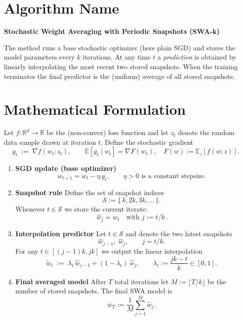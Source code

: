 \documentclass{article}
\begin{document}
\section*{Algorithm Name}
\textbf{Stochastic Weight Averaging with Periodic Snapshots (SWA‑k)}  

The method runs a base stochastic optimizer (here plain SGD) and stores the model parameters every $k$ iterations.  
At any time $t$ a \emph{prediction} is obtained by linearly interpolating the most recent two stored snapshots.  
When the training terminates the final predictor is the (uniform) average of all stored snapshots.

\section*{Mathematical Formulation}
Let $f:\mathbb{R}^d\!\to\!\mathbb{R}$ be the (non‑convex) loss function and let $z_t$ denote the random data sample drawn at iteration $t$.  
Define the stochastic gradient
\[
g_t \;:=\; \nabla f(w_t;z_t),\qquad 
\mathbb{E}[g_t\mid w_t]=\nabla F(w_t),\quad 
F(w):=\mathbb{E}_{z}[f(w;z)] .
\]

\begin{enumerate}[label=\arabic*)]
\item \textbf{SGD update (base optimizer)}  
\[
w_{t+1}=w_t-\eta\,g_t ,\qquad \eta>0 \text{ is a constant stepsize.}
\tag{1}
\]

\item \textbf{Snapshot rule}  
Define the set of snapshot indices
\[
\mathcal{S}:=\{\,k,2k,3k,\dots\,\}.
\]
Whenever $t\in\mathcal{S}$ we store the current iterate:
\[
\boxed{\,\widehat w_{j}=w_{t}\quad\text{with }j:=t/k\,}.
\tag{2}
\]

\item \textbf{Interpolation predictor}  
Let $t\in\mathcal{S}$ and denote the two latest snapshots
\[
\widehat w_{j-1},\;\widehat w_{j},\qquad j=t/k .
\]
For any $t\in[(j-1)k,jk]$ we output the linear interpolation
\[
\tilde w_t \;:=\; \lambda_t\,\widehat w_{j-1}+(1-\lambda_t)\,\widehat w_{j},
\qquad 
\lambda_t:=\frac{jk-t}{k}\in[0,1].
\tag{3}
\]

\item \textbf{Final averaged model}  
After $T$ total iterations let $M:=\lfloor T/k\rfloor$ be the number of stored snapshots.  
The final SWA model is
\[
\boxed{\,\bar w_T:=\frac{1}{M}\sum_{j=1}^{M}\widehat w_{j}\,}.
\tag{4}
\]
\end{enumerate}
\end{document}
